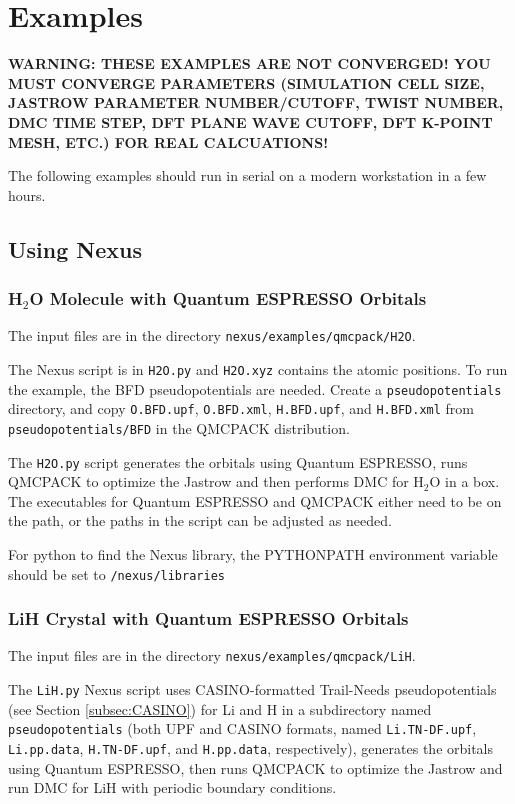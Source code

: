 \chapter{Examples}
\label{chap:examples}

\textbf{WARNING: THESE EXAMPLES ARE NOT CONVERGED! YOU MUST CONVERGE PARAMETERS (SIMULATION CELL SIZE, JASTROW PARAMETER NUMBER/CUTOFF, TWIST NUMBER, DMC TIME STEP, DFT PLANE WAVE CUTOFF, DFT K-POINT MESH, ETC.) FOR REAL CALCUATIONS!}

The following examples should run in serial on a modern workstation in a few hours.

\section{Using Nexus}

\subsection{H$_2$O Molecule with Quantum ESPRESSO Orbitals}

The input files are in the directory \texttt{nexus/examples/qmcpack/H2O}.

The Nexus script is in \texttt{H2O.py} and \texttt{H2O.xyz} contains the atomic positions.
To run the example, the BFD pseudopotentials are needed.  Create a \texttt{pseudopotentials} directory, and copy \texttt{O.BFD.upf}, \texttt{O.BFD.xml}, \texttt{H.BFD.upf}, and \texttt{H.BFD.xml} from \texttt{pseudopotentials/BFD} in the QMCPACK distribution.

The \texttt{H2O.py} script generates the orbitals using Quantum ESPRESSO, runs QMCPACK to optimize the Jastrow and then performs DMC for H$_2$O in a box.
The executables for Quantum ESPRESSO and QMCPACK either need to be on the path, or the paths in the script can be adjusted as needed.

For python to find the Nexus library, the PYTHONPATH environment variable should be set to \texttt{/nexus/libraries}



\subsection{LiH Crystal with Quantum ESPRESSO Orbitals}
The input files are in the directory \texttt{nexus/examples/qmcpack/LiH}.

The \texttt{LiH.py} Nexus script uses CASINO-formatted Trail-Needs pseudopotentials (see Section \ref{subsec:CASINO}) for Li and H in a subdirectory named \texttt{pseudopotentials} (both UPF and CASINO  formats, named \texttt{Li.TN-DF.upf}, \texttt{Li.pp.data}, \texttt{H.TN-DF.upf}, and \texttt{H.pp.data}, respectively), generates the orbitals using Quantum ESPRESSO, then runs QMCPACK to optimize the Jastrow and run DMC for LiH with periodic boundary conditions.
